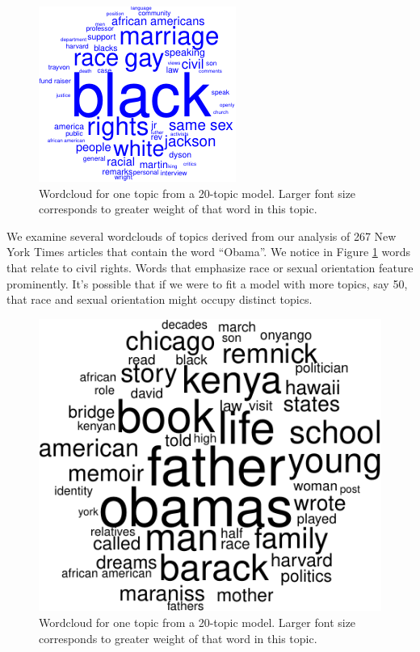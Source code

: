 \documentclass[12pt,]{article}
\begin{document}
\begin{figure}
\includegraphics[width=\textwidth]{2016-03-17-obama_files/figure-latex/wordcloud-3.pdf}
\caption{Wordcloud for one topic from a 20-topic model. Larger font size corresponds to greater weight of that word in this topic.\label{fig:wc3}}
\end{figure}

We examine several wordclouds of topics derived from our analysis of 267
New York Times articles that contain the word ``Obama''. We notice in
Figure \ref{fig:wc3} words that relate to civil rights. Words that
emphasize race or sexual orientation feature prominently. It's possible
that if we were to fit a model with more topics, say 50, that race and
sexual orientation might occupy distinct topics.

\begin{figure}
\includegraphics[width=\textwidth]{2016-03-17-obama_files/figure-latex/wordcloud-4.pdf}
\caption{Wordcloud for one topic from a 20-topic model. Larger font size corresponds to greater weight of that word in this topic.\label{fig:wc4}}
\end{figure}
\end{document}
